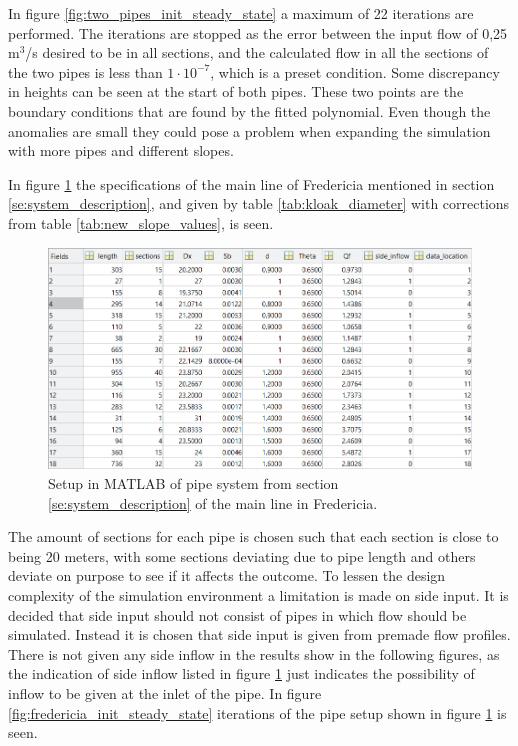 In figure \ref{fig:two_pipes_init_steady_state} a maximum of 22 iterations are performed. The iterations are stopped as the error between the input flow of 0,25 $\text{m}^\text{3}$/s desired to be in all sections, and the calculated flow in all the sections of the two pipes is less than $1\cdot10^{-7}$, which is a preset condition. 
Some discrepancy in heights can be seen at the start of both pipes. These two points are the boundary conditions that are found by the fitted polynomial. Even though the anomalies are small they could pose a problem when expanding the simulation with more pipes and different slopes. 

In figure \ref{fig:Fredericia_pipe_setup} the specifications of the main line of Fredericia mentioned in section \ref{se:system_description}, and given by table \ref{tab:kloak_diameter} with corrections from table \ref{tab:new_slope_values}, is seen.

\begin{figure}[H]
\centering
\includegraphics[width=0.97 \textwidth]{report/simulation/pictures/Fredericia_pipe_setup2.PNG}
\caption{Setup in MATLAB of pipe system from section \ref{se:system_description} of the main line in Fredericia.}
\label{fig:Fredericia_pipe_setup}
\end{figure}

The amount of sections for each pipe is chosen such that each section is close to being 20 meters, with some sections deviating due to pipe length and others deviate on purpose to see if it affects the outcome.  
To lessen the design complexity of the simulation environment a limitation is made on side input. It is decided that side input should not consist of pipes in which flow should be simulated. Instead it is chosen that side input is given from premade flow profiles. 
There is not given any side inflow in the results show in the following figures, as the indication of side inflow listed in figure \ref{fig:Fredericia_pipe_setup} just indicates the possibility of inflow to be given at the inlet of the pipe. 
In figure \ref{fig:fredericia_init_steady_state} iterations of the pipe setup shown in figure \ref{fig:Fredericia_pipe_setup} is seen. 




